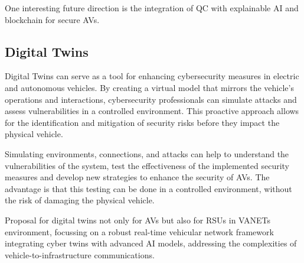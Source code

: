 One interesting future direction is the integration of QC with explainable
AI and blockchain for secure AVs\cite{bendiab2023autonomous}.


\subsection{Digital Twins}\label{subsec:digital-twins}
Digital Twins can serve as a tool for enhancing cybersecurity measures in electric and autonomous vehicles.
By creating a virtual model that mirrors the vehicle's operations and interactions,
cybersecurity professionals can simulate attacks and assess vulnerabilities in a controlled environment.
This proactive approach allows for the identification and mitigation of security risks
before they impact the physical vehicle\cite{ali2023review}.

Simulating environments, connections,
and attacks can help to understand the vulnerabilities of the system, test the effectiveness of the implemented security measures and develop new strategies to enhance the security of AVs.
The advantage is that this testing can be done in a controlled environment, without the risk of damaging the physical vehicle.\cite{yigit2024cyber}

Proposal for digital twins not only for AVs but also for RSUs in VANETs environment,
focussing on a robust real-time vehicular network framework integrating cyber twins with advanced AI models,
addressing the complexities of vehicle-to-infrastructure communications\cite{yigit2024cyber}.